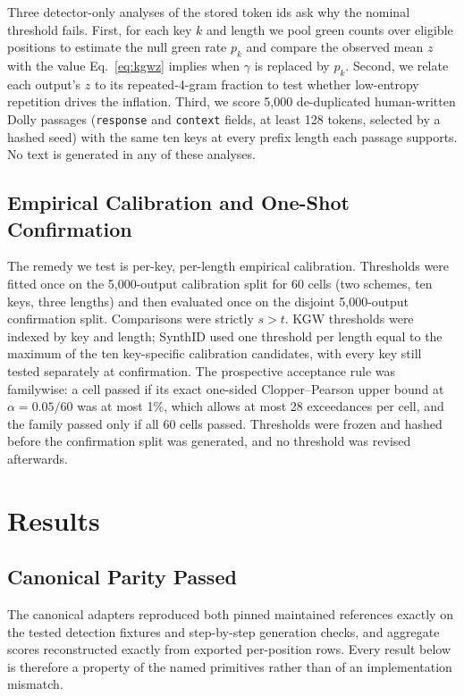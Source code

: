 \documentclass[conference]{IEEEtran}
\begin{document}
Three detector-only analyses of the stored token ids ask why the nominal
threshold fails. First, for each key $k$ and length we pool green counts over
eligible positions to estimate the null green rate $p_k$ and compare the observed
mean $z$ with the value Eq.~\eqref{eq:kgwz} implies when $\gamma$ is replaced by
$p_k$. Second, we relate each output's $z$ to its repeated-4-gram fraction to test
whether low-entropy repetition drives the inflation. Third, we score 5,000
de-duplicated human-written Dolly passages (\texttt{response} and \texttt{context}
fields, at least 128 tokens, selected by a hashed seed) with the same ten keys at
every prefix length each passage supports. No text is generated in any of these
analyses.

\subsection{Empirical Calibration and One-Shot Confirmation}
\label{sec:calib}

The remedy we test is per-key, per-length empirical calibration. Thresholds were
fitted once on the 5,000-output calibration split for 60 cells (two schemes, ten
keys, three lengths) and then evaluated once on the disjoint 5,000-output
confirmation split. Comparisons were strictly $s>t$. KGW thresholds were indexed
by key and length; SynthID used one threshold per length equal to the maximum of
the ten key-specific calibration candidates, with every key still tested
separately at confirmation. The prospective acceptance rule was familywise: a cell
passed if its exact one-sided Clopper--Pearson upper bound at $\alpha=0.05/60$ was
at most 1\%, which allows at most 28 exceedances per cell, and the family passed
only if all 60 cells passed. Thresholds were frozen and hashed before the
confirmation split was generated, and no threshold was revised afterwards.

\section{Results}

\subsection{Canonical Parity Passed}

The canonical adapters reproduced both pinned maintained references exactly on the
tested detection fixtures and step-by-step generation checks, and aggregate scores
reconstructed exactly from exported per-position rows. Every result below is
therefore a property of the named primitives rather than of an implementation
mismatch.
\end{document}
